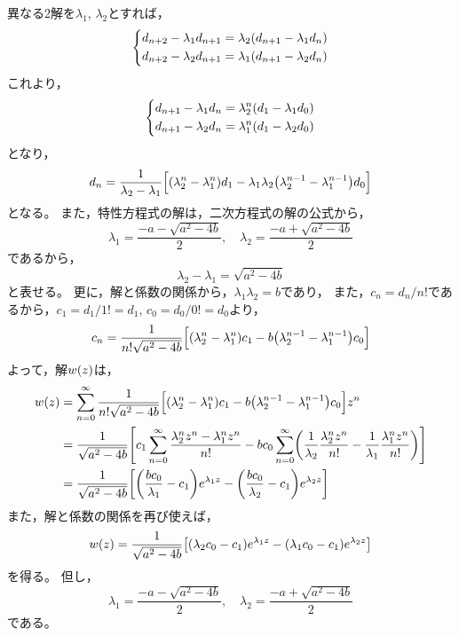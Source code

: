 \documentclass[a4paper,draft]{ltjsarticle}
\begin{document}
    異なる2解を$\lambda_1$, $\lambda_2$とすれば，
    \begin{equation}
        \case{
            d_{n+2}-\lambda_1d_{n+1}=\lambda_2\pare{d_{n+1}-\lambda_1d_n}
            \\
            d_{n+2}-\lambda_2d_{n+1}=\lambda_1\pare{d_{n+1}-\lambda_2d_n}
        }
    \end{equation}
    これより，
    \begin{equation}
        \case{
            d_{n+1}-\lambda_1d_n={\lambda_2^n}\pare{d_1-\lambda_1d_0}
            \\
            d_{n+1}-\lambda_2d_n={\lambda_1^n}\pare{d_1-\lambda_2d_0}
        }
    \end{equation}
    となり，
    \begin{equation}
        d_n=\dfrac{1}{\lambda_2-\lambda_1}\bsqu{\pare{\lambda^n_2-\lambda^n_1}d_1-\lambda_1\lambda_2\pare{\lambda^{n-1}_2-\lambda^{n-1}_1}d_0}
    \end{equation}
    となる。
    また，特性方程式の解は，二次方程式の解の公式から，
    \begin{equation}
        \lambda_1  =\dfrac{-a-\sqrt{a^2-4b}}{2}
        ,\quad
        \lambda_2  =\dfrac{-a+\sqrt{a^2-4b}}{2}
    \end{equation}
    であるから，
    \begin{equation}
        \lambda_2-\lambda_1=\sqrt{a^2-4b}
    \end{equation}
    と表せる。
    更に，解と係数の関係から，$\lambda_1\lambda_2=b$であり，
    また，$c_n=d_n/n!$であるから，$c_1=d_1/1!=d_1$, $c_0=d_0/0!=d_0$より，
    \begin{equation}
        c_n=\dfrac{1}{n!\sqrt{a^2-4b}}\bsqu{\pare{\lambda^n_2-\lambda^n_1}c_1-b\pare{\lambda^{n-1}_2-\lambda^{n-1}_1}c_0}
    \end{equation}
    よって，解$w\pare{z}$は，
    \begin{align}
        w\pare{z} & =\sum_{n=0}^\infty \dfrac{1}{n!\sqrt{a^2-4b}}\bsqu{\pare{\lambda^n_2-\lambda^n_1}c_1-b\pare{\lambda^{n-1}_2-\lambda^{n-1}_1}c_0}z^n
        \\
                    & =\dfrac{1}{\sqrt{a^2-4b}}\squ{
            c_1\sum_{n=0}^\infty \dfrac{\lambda^n_2 z^n -\lambda^n_1 z^n}{n!}
            -bc_0\sum_{n=0}^\infty \pare{\dfrac{1}{\lambda_2}\dfrac{\lambda^n_2z^n}{n!}-\dfrac{1}{\lambda_1}\dfrac{\lambda^n_1z^n}{n!}}
        }
        \\
                    & =\dfrac{1}{\sqrt{a^2-4b}}\squ{\pare{\dfrac{bc_0}{\lambda_1}-c_1}e^{\lambda_1 z}-\pare{\dfrac{bc_0}{\lambda_2}-c_1}e^{\lambda_2 z}}
    \end{align}
    また，解と係数の関係を再び使えば，
    \begin{equation}
        w\pare{z}=\dfrac{1}{\sqrt{a^2-4b}}\squ{\pare{\lambda_2c_0-c_1}e^{\lambda_1 z}-\pare{\lambda_1 c_0-c_1}e^{\lambda_2 z}}
    \end{equation}
    を得る。
    但し，
    \begin{equation}
        \lambda_1  =\dfrac{-a-\sqrt{a^2-4b}}{2}
        ,\quad
        \lambda_2  =\dfrac{-a+\sqrt{a^2-4b}}{2}
    \end{equation}
    である。
\end{document}
